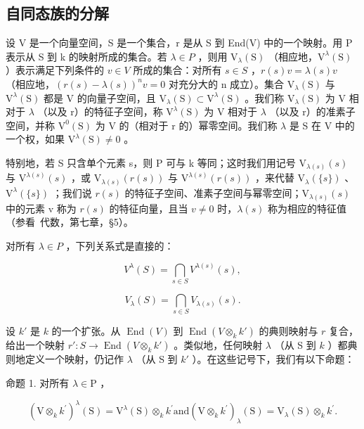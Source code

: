 \subsection{自同态族的分解}

设 V 是一个向量空间，S 是一个集合，r 是从 S 到 End(V) 中的一个映射。用 P 表示从 S 到 k 的映射所成的集合。若 \(\lambda \in P\) ，则用 \(\mathrm{V}_{\lambda}(\mathrm{S})\) （相应地，\(\mathrm{V}^{\lambda}(\mathrm{S})\) ）表示满足下列条件的 \(v \in V\) 所成的集合：对所有 \(s \in S\) ，\(r(s)v = \lambda(s)v\) （相应地，\((r(s) - \lambda(s))^{n}v = 0\) 对充分大的 n 成立）。集合 \(\mathrm{V}_{\lambda}(\mathrm{S})\) 与 \(\mathrm{V}^{\lambda}(\mathrm{S})\) 都是 V 的向量子空间，且 \(\mathrm{V}_{\lambda}(\mathrm{S}) \subset \mathrm{V}^{\lambda}(\mathrm{S})\) 。我们称 \(\mathrm{V}_{\lambda}(\mathrm{S})\) 为 V 相对于 \(\lambda\) （以及 r）的特征子空间，称 \(\mathrm{V}^{\lambda}(\mathrm{S})\) 为 V 相对于 \(\lambda\) （以及 r）的准素子空间，并称 \(\mathrm{V}^{0}(\mathrm{S})\) 为 V 的（相对于 r 的）幂零空间。我们称 \(\lambda\) 是 S 在 V 中的一个权，如果 \(\mathrm{V}^{\lambda}(\mathrm{S}) \neq 0\) 。

特别地，若 S 只含单个元素 s，则 P 可与 k 等同；这时我们用记号 \(\mathrm{V}_{\lambda(s)}(s)\) 与 \(\mathrm{V}^{\lambda(s)}(s)\) ，或 \(\mathrm{V}_{\lambda(s)}(r(s))\) 与 \(\mathrm{V}^{\lambda(s)}(r(s))\) ，来代替 \(\mathrm{V}_{\lambda}(\{s\})\) 、\(\mathrm{V}^{\lambda}(\{s\})\) ；我们说 \(r(s)\) 的特征子空间、准素子空间与幂零空间；\(\mathrm{V}_{\lambda(s)}(s)\) 中的元素 v 称为 \(r(s)\) 的特征向量，且当 \(v \neq 0\) 时，\(\lambda(s)\) 称为相应的特征值（参看~代数，第七章，§5）。

对所有 \(\lambda\in P\) ，下列关系式是直接的：

\[
V ^ {\lambda} (S) = \bigcap_ {s \in S} V ^ {\lambda (s)} (s),\tag{1}
\]

\[
V _ {\lambda} (S) = \bigcap_ {s \in S} V _ {\lambda (s)} (s).\tag{2}
\]

设 \(k'\) 是 \(k\) 的一个扩张。从 \(\operatorname{End}(V)\) 到 \(\operatorname{End}(V \otimes_k k')\) 的典则映射与 \(r\) 复合，给出一个映射 \(r' : S \to \operatorname{End}(V \otimes_k k')\) 。类似地，任何映射 \(\lambda\) （从 S 到 \(k\) ）都典则地定义一个映射，仍记作 \(\lambda\) （从 S 到 \(k'\) ）。在这些记号下，我们有以下命题：

命题 1. 对所有 \(\lambda \in \mathrm{P}\) ，

\[
(\mathrm{V} \otimes_ {k} k ^ {\prime}) ^ {\lambda} (\mathrm{S}) = \mathrm{V} ^ {\lambda} (\mathrm{S}) \otimes_ {k} k ^ {\prime} \text {and} (\mathrm{V} \otimes_ {k} k ^ {\prime}) _ {\lambda} (\mathrm{S}) = \mathrm{V} _ {\lambda} (\mathrm{S}) \otimes_ {k} k ^ {\prime}.
\]

